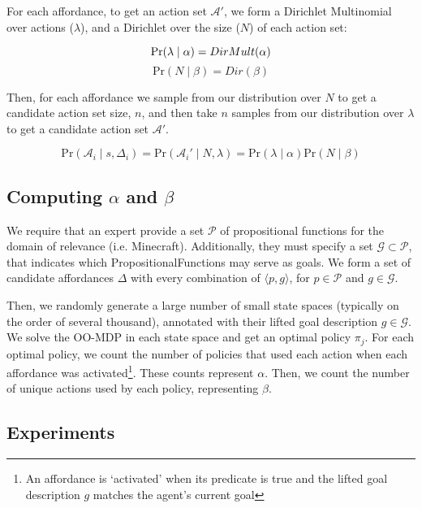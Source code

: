 \documentclass[conference]{IEEEtran}
\begin{document}
For each affordance, to get an action set $\mathcal{A}'$, we form a Dirichlet Multinomial
over actions ($\lambda$), and a Dirichlet over the size ($N$) of each action set:

\begin{equation}
\text{Pr}(\lambda \mid \alpha) = DirMult(\alpha) \\
\end{equation}
\begin{equation}
\text{Pr}(N \mid \beta) = Dir(\beta)
\end{equation}

Then, for each affordance we sample from our distribution over $N$ to get a candidate action set size, $n$, and then
take $n$ samples from our distribution over $\lambda$ to get a candidate action set $\mathcal{A}'$.

\begin{equation}
\text{Pr}(\mathcal{A}_i \mid s,\Delta_i) = \text{Pr}(\mathcal{A}_i' \mid N, \lambda) = \text{Pr}(\lambda \mid \alpha) \text{Pr}(N \mid \beta)
\end{equation}
\subsection{Computing $\alpha$ and $\beta$}

We require that an expert provide a set $\mathcal{P}$ of propositional functions
for the domain of relevance (i.e. Minecraft). Additionally, they must specify a set
$\mathcal{G} \subset \mathcal{P}$, that indicates which PropositionalFunctions may serve as goals.
We form a set of candidate affordances $\Delta$ with every combination of $\langle p, g \rangle$, for $p \in \mathcal{P}$ and $g \in \mathcal{G}$.

Then, we randomly generate a large number of small state spaces (typically on the order of several thousand), annotated with their
lifted goal description $g \in \mathcal{G}$. We solve the OO-MDP in each state space and get an optimal policy $\pi_j$. For each optimal policy,
we count the number of policies that used each action when each affordance was activated\footnote{An affordance is `activated' when its predicate is true
and the lifted goal description $g$ matches the agent's current goal}. These counts represent $\alpha$. Then, we count the number of unique actions
used by each policy, representing $\beta$.


\subsection{Experiments}
\end{document}

